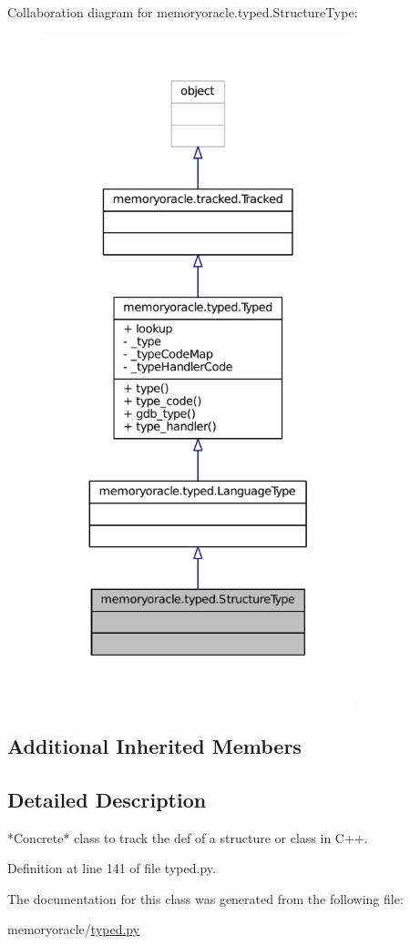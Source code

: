 Collaboration diagram for memoryoracle.\+typed.\+Structure\+Type\+:\nopagebreak
\begin{figure}[H]
\begin{center}
\leavevmode
\includegraphics[height=550pt]{classmemoryoracle_1_1typed_1_1StructureType__coll__graph}
\end{center}
\end{figure}
\subsection*{Additional Inherited Members}


\subsection{Detailed Description}
\begin{DoxyVerb}*Concrete* class to track the def of a structure or class in C++.
\end{DoxyVerb}
 

Definition at line 141 of file typed.\+py.



The documentation for this class was generated from the following file\+:\begin{DoxyCompactItemize}
\item 
memoryoracle/\hyperlink{typed_8py}{typed.\+py}\end{DoxyCompactItemize}
